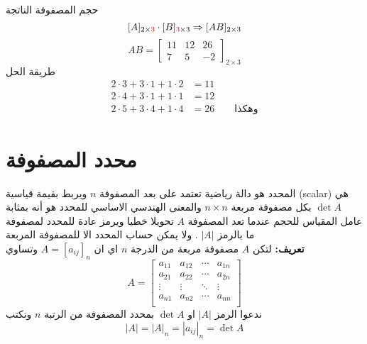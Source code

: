 حجم المصفوفة الناتجة 
\[
[A]_{2\times \textcolor{red}{3}}\cdot [B]_{\textcolor{red}{3}\times 3} \Rightarrow [AB]_{2\times 3}
\]
\[
AB = 
\begin{bmatrix}
	11& 12& 26\\
	7 &5& -2 
\end{bmatrix}_{2\times 3}
\]
طريقة الحل 
\begin{align*}
	2\cdot3 + 3\cdot1 +1\cdot2&=11\\
	2\cdot4 + 3\cdot1 + 1\cdot1 &= 12\\
	2\cdot5 + 3\cdot4 + 1\cdot 4&= 26 \qquad \text{وهكذا}
\end{align*}

\section{محدد المصفوفة}
المحدد هو دالة رياضية تعتمد على بعد المصفوفة $n$ ويربط بقيمة قياسية (scalar) هي $\det A$ بكل مصفوفة مربعة $n\times n$ والمعنى الهندسي الاساسي للمحدد هو أنه بمثابة عامل المقياس للحجم عندما تعد المصفوفة $A$ تحويلا خطيا ويرمز عادة للمحدد لمصفوفة ما بالرمز $|A|$ . ولا يمكن حساب المحدد الا للمصفوفة المربعة\\ [10pt]
\noindent
\textbf{تعريف:} لتكن $A$ مصفوفة مربعة من الدرجة $n$ اي ان $A=[a_{ij}]_n$ وتساوي
\[
A =
\begin{bmatrix}
	a_{11} & a_{12} & \cdots & a_{1n}\\
	a_{21} & a_{22} & \cdots & a_{2n}\\
		\vdots & \vdots & \ddots & \vdots\\
	a_{n1} & a_{n2} & \cdots & a_{nn}\\
\end{bmatrix}
\] 
ندعوا الرمز $|A|$ او $\det A$ بمحدد المصفوفة من الرتبة $n$ ونكتب
\[
|A| = |A|_n = |a_{ij}|_{n} = \det A
\]

